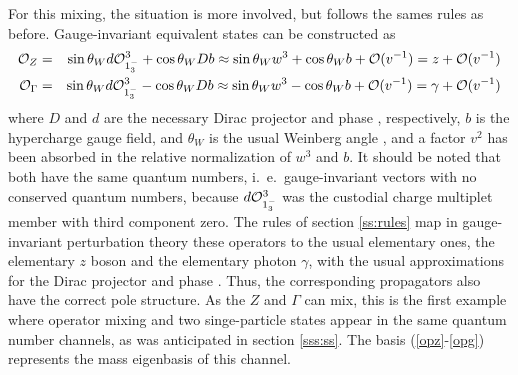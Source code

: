 \documentclass[final,12pt]{article}
\newcommand*{\no}{\noindent}
\newcommand*{\bea}{\begin{eqnarray}}
\newcommand*{\eea}{\end{eqnarray}}
\newcommand*{\prefr}[2]{(\ref{#1}-\ref{#2})}
\newcommand*{\1}{1\!\!\!\bot}
\newcommand*{\op}{{\cal O}}
\begin{document}
For this mixing, the situation is more involved, but follows the sames rules as before. Gauge-invariant equivalent states can be constructed as
\bea
\op_Z&=&\sin\theta_Wd\op_{1^-_3}^3+\cos\theta_W Db\approx \sin\theta_W w^3+\cos\theta_W b+\op(v^{-1})=z+{\cal O}(v^{-1})\label{opz}\\
\op_\Gamma&=&\sin\theta_Wd\op_{1^-_3}^3-\cos\theta_W Db\approx \sin\theta_W w^3-\cos\theta_W b+\op(v^{-1})=\gamma+{\cal O}(v^{-1})\label{opg}
\eea
\no where $D$ and $d$ are the necessary Dirac projector and phase \cite{Lavelle:1995ty}, respectively, $b$ is the hypercharge gauge field, and $\theta_W$ is the usual Weinberg angle \cite{Bohm:2001yx}, and a factor $v^2$ has been absorbed in the relative normalization of $w^3$ and $b$. It should be noted that both have the same quantum numbers, i.\ e.\ gauge-invariant vectors with no conserved quantum numbers, because $d\op_{1^-_3}^3$ was the custodial charge multiplet member with third component zero. The rules of section \ref{ss:rules} map in gauge-invariant perturbation theory these operators to the usual elementary ones, the elementary $z$ boson and the elementary photon $\gamma$, with the usual approximations for the Dirac projector and phase \cite{Lavelle:1995ty}. Thus, the corresponding propagators also have the correct pole structure. As the $Z$ and $\Gamma$ can mix, this is the first example where operator mixing and two singe-particle states appear in the same quantum number channels, as was anticipated in section \ref{sss:ss}. The basis \prefr{opz}{opg} represents the mass eigenbasis of this channel.
\end{document}
